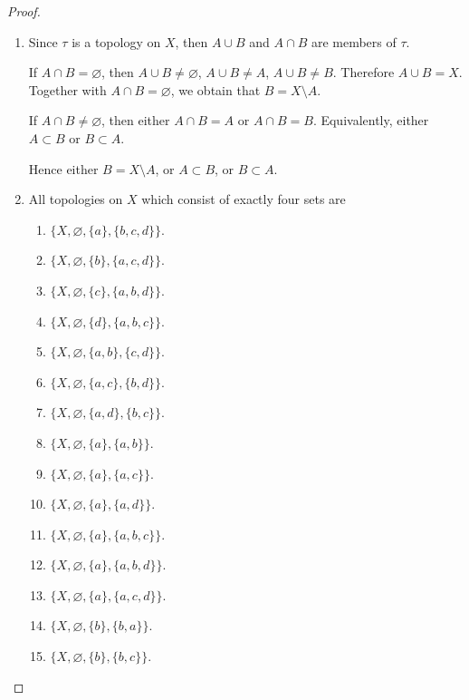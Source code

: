 \begin{proof}
    \begin{enumerate}[label={(\roman*)}]
        \item Since $\tau$ is a topology on $X$, then $A\cup B$ and $A\cap B$ are members of $\tau$.

              If $A\cap B = \varnothing$, then $A\cup B\ne \varnothing$, $A\cup B\ne A$, $A\cup B\ne B$. Therefore $A\cup B = X$. Together with $A\cap B = \varnothing$, we obtain that $B = X\setminus A$.

              If $A\cap B\ne \varnothing$, then either $A\cap B = A$ or $A\cap B = B$. Equivalently, either $A\subset B$ or $B\subset A$.

              Hence either $B = X\setminus A$, or $A\subset B$, or $B\subset A$.
        \item All topologies on $X$ which consist of exactly four sets are
              \begin{enumerate}[label={(\arabic*)}]
                  \item $\{ X, \varnothing, \{ a \}, \{ b, c, d \} \}$.
                  \item $\{ X, \varnothing, \{ b \}, \{ a, c, d \} \}$.
                  \item $\{ X, \varnothing, \{ c \}, \{ a, b, d \} \}$.
                  \item $\{ X, \varnothing, \{ d \}, \{ a, b, c \} \}$.
                  \item $\{ X, \varnothing, \{ a, b \}, \{ c, d \} \}$.
                  \item $\{ X, \varnothing, \{ a, c \}, \{ b, d \} \}$.
                  \item $\{ X, \varnothing, \{ a, d \}, \{ b, c \} \}$.
                  \item $\{ X, \varnothing, \{ a \}, \{ a, b \} \}$.
                  \item $\{ X, \varnothing, \{ a \}, \{ a, c \} \}$.
                  \item $\{ X, \varnothing, \{ a \}, \{ a, d \} \}$.
                  \item $\{ X, \varnothing, \{ a \}, \{ a, b, c \} \}$.
                  \item $\{ X, \varnothing, \{ a \}, \{ a, b, d \} \}$.
                  \item $\{ X, \varnothing, \{ a \}, \{ a, c, d \} \}$.
                  \item $\{ X, \varnothing, \{ b \}, \{ b, a \} \}$.
                  \item $\{ X, \varnothing, \{ b \}, \{ b, c \} \}$.

\end{enumerate}
\end{enumerate}
\end{proof}
